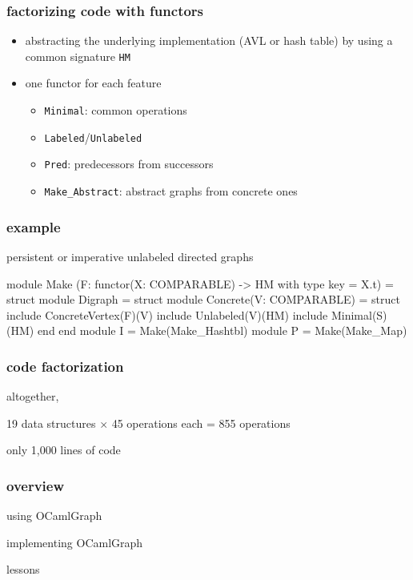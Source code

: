 \documentclass{beamer}
\newcommand{\monvert}[1]{{\color{blue}#1}}
\newcommand{\excode}[1]{\monvert{\texttt{#1}}}
\let\emph\alert
\begin{document}
\begin{frame}
  \frametitle{factorizing code with functors}
  \begin{itemize}
  \item
    abstracting the underlying implementation (AVL or hash table) by using a
    common signature \excode{HM}

  \vskip8pt
  \item
    one functor for each feature
    \vskip1pt
    \begin{itemize}
    \item \excode{Minimal}: common operations
      \vskip6pt
    \item \excode{Labeled}/\excode{Unlabeled}
      \vskip6pt
    \item \excode{Pred}: predecessors from successors
      \vskip6pt
    \item \excode{Make\_Abstract}: abstract graphs from concrete ones
    \end{itemize}
  \end{itemize}
\end{frame}

\begin{frame}[containsverbatim]
  \frametitle{example}

persistent or imperative unlabeled directed graphs

\begin{ocaml}
module Make
  (F: functor(X: COMPARABLE) -> HM with type key = X.t) =
struct
  module Digraph = struct
    module Concrete(V: COMPARABLE) = struct
      include ConcreteVertex(F)(V)
      include Unlabeled(V)(HM)
      include Minimal(S)(HM)
    end
end
module I = Make(Make_Hashtbl)
module P = Make(Make_Map)
\end{ocaml}
\end{frame}

\begin{frame}
  \frametitle{code factorization}

  altogether,

  19 data structures $\times$ 45 operations each = 855 operations

  \bigskip
  only \emph{1,000 lines} of code
\end{frame}




\begin{frame}
  \frametitle{overview}
  \begin{itemize}
    \item \textcolor{black!30}{using OCamlGraph\vskip15pt
    \item implementing OCamlGraph\vskip15pt}
  \item lessons
  \end{itemize}
\end{frame}
\end{document}
